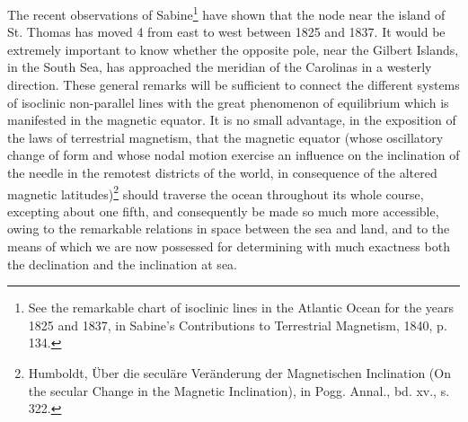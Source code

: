 The recent observations of Sabine\footnote{See the remarkable chart of isoclinic lines in the Atlantic Ocean for the years 1825 and 1837, in Sabine's Contributions to Terrestrial Magnetism, 1840, p. 134.} have shown that the node near the island of St. Thomas has moved 4 from east to west between 1825 and 1837. It would be extremely important to know whether the opposite pole, near the Gilbert Islands, in the South Sea, has approached the meridian of the Carolinas in a westerly direction. These general remarks will be sufficient to connect the different systems of isoclinic non-parallel lines with the great phenomenon of equilibrium which is manifested in the magnetic equator. It is no small advantage, in the exposition of the laws of terrestrial magnetism, that the magnetic equator (whose oscillatory change of form and whose nodal motion exercise an influence on the inclination of the needle in the remotest districts of the world, in consequence of the altered magnetic latitudes)\footnote{Humboldt, Über die seculäre Veränderung der Magnetischen Inclination (On the secular Change in the Magnetic Inclination), in Pogg. Annal., bd. xv., s. 322.} should traverse the ocean throughout its whole course, excepting about one fifth, and consequently be made so much more accessible, owing to the remarkable relations in space between the sea and land, and to the means of which we are now possessed for determining with much exactness both the declination and the inclination at sea.

